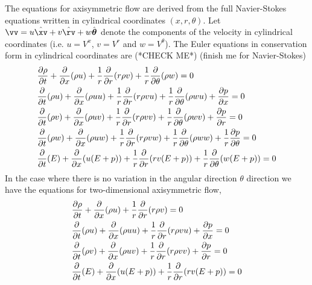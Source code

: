 \documentclass{article}
\begin{document}
The equations for axisymmetric flow are derived from the full Navier-Stokes equations written in
cylindrical coordinates $(x,r,\theta)$. Let $\vv = u \hat{\xv} + v \hat{\rv} + w\hat{\thetav}$
denote the components of the velocity in cylindrical coordinates (i.e. $u=V^x$, $v=V^r$ and $w=V^{\theta}$).
The Euler equations in conservation form in cylindrical coordinates are (*CHECK ME*) (finish me for Navier-Stokes)
\begin{align}
 & {\partial \rho\over\partial t} + {\partial \over\partial x}( \rho u ) + \frac{1}{r}{\partial \over\partial r}( r \rho v ) 
               + \frac{1}{r}{\partial \over\partial \theta}(\rho w) = 0\\
 &  {\partial \over\partial t}(\rho u)  + {\partial \over\partial x}( \rho u u ) + \frac{1}{r}{\partial \over\partial r}( r \rho v u ) 
               + \frac{1}{r}{\partial \over\partial \theta}(\rho w u) + {\partial p \over\partial x} = 0 \\ 
 &  {\partial \over\partial t}(\rho v) + {\partial \over\partial x}( \rho u v ) + \frac{1}{r}{\partial \over\partial r}( r \rho v v ) 
               + \frac{1}{r}{\partial \over\partial \theta}(\rho w v) + {\partial p \over\partial r} = 0 \\ 
 &  {\partial\over\partial t}(\rho w)  + {\partial \over\partial x}( \rho u w ) + \frac{1}{r}{\partial \over\partial r}( r \rho v w ) 
               + \frac{1}{r}{\partial \over\partial \theta}(\rho w w) + \frac{1}{r}{\partial p \over\partial \theta } = 0 \\ 
 &  {\partial\over\partial t}(E)  + {\partial \over\partial x}( u (E+p) ) + \frac{1}{r}{\partial \over\partial r}( r v (E+p) ) 
               + \frac{1}{r}{\partial \over\partial \theta}(w (E+p))  = 0
\end{align}
In the case where there is no variation in the angular direction $\theta$
direction we have the equations for two-dimensional axisymmetric flow, 
\begin{align}
 & {\partial \rho\over\partial t} + {\partial \over\partial x}( \rho u ) + \frac{1}{r}{\partial \over\partial r}( r \rho v ) 
               = 0\\
 &  {\partial \over\partial t}(\rho u)  + {\partial \over\partial x}( \rho u u ) + \frac{1}{r}{\partial \over\partial r}( r \rho v u ) 
                + {\partial p \over\partial x} = 0 \\ 
 &  {\partial \over\partial t}(\rho v) + {\partial \over\partial x}( \rho u v ) + \frac{1}{r}{\partial \over\partial r}( r \rho v v ) 
                + {\partial p \over\partial r} = 0 \\ 
 &  {\partial\over\partial t}(E)  + {\partial \over\partial x}( u (E+p) ) + \frac{1}{r}{\partial \over\partial r}( r v (E+p) ) 
                 = 0
\end{align}
\end{document}
